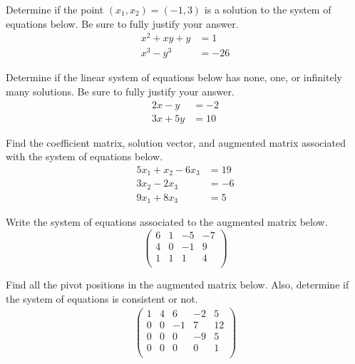\documentclass[11pt,letterpaper]{article}
\begin{document}

 Determine if the point $(x_1, x_2)= (-1, 3)$ is a solution to the system of equations below. Be sure to fully justify your answer.
	\[
	\begin{aligned}
	x^2 + xy + y&= 1 \\
	x^3 - y^3&= -26
	\end{aligned}
	\]



\newpage



 Determine if the linear system of equations below has none, one, or infinitely many solutions. Be sure to fully justify your answer. 
	\[
	\begin{aligned}
	2x - y&= -2 \\
	3x + 5y&= 10
	\end{aligned}
	\]



\newpage



 Find the coefficient matrix, solution vector, and augmented matrix associated with the system of equations below. 
	\[
	\begin{aligned}
	5x_1 + x_2 - 6x_3&= 19 \\
	3x_2 - 2x_3&= -6 \\
	9x_1 + 8x_3&= 5
	\end{aligned}
	\]



\newpage



 Write the system of equations associated to the augmented matrix below. 
	\[
	\begin{pmatrix}
	6 & 1 & -5 & -7 \\
	4 & 0 & -1 & 9 \\
	1 & 1 & 1 & 4 \\
	\end{pmatrix}
	\]



\newpage



 Find all the pivot positions in the augmented matrix below. Also, determine if the system of equations is consistent or not. 
	\[
	\begin{aligned}
	\begin{pmatrix}
	1 & 4 & 6 & -2 & 5 \\
	
	0 & 0 & -1 & 7 & 12 \\
	0 & 0 & 0 & -9 & 5 \\
	0 & 0 & 0 & 0 & 1 \\
	\end{pmatrix}
	\end{aligned}
	\]
\end{document}
